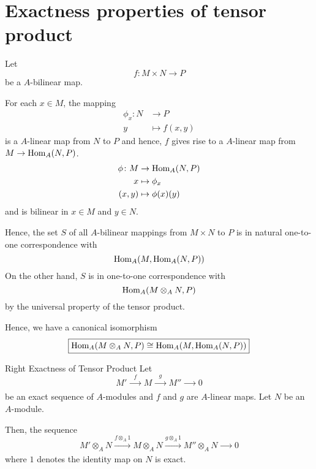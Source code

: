 \pagebreak

\section{Exactness properties of tensor product}

Let
\[
	f \colon M \times N \to P
\]
be a \(A\)-bilinear map.

For each \(x \in M\), the mapping
\begin{align*}
	\phi_x \colon N &\to P \\
	y &\mapsto f(x, y)
\end{align*}
is a \(A\)-linear map from \(N\) to \(P\) and hence, \(f\)
gives rise to a \(A\)-linear map from \(M \to \operatorname{Hom}_A(N, P)\).
\begin{align*}
	\phi \colon M &\to \operatorname{Hom}_A(N, P) \\
	x &\mapsto \phi_x \\
	(x, y) &\mapsto \phi(x)(y)
\end{align*}
and is bilinear in \(x \in M\) and \(y \in N\).

Hence, the set \(S\) of all \(A\)-bilinear mappings from \(M \times N\)
to \(P\) is in natural one-to-one correspondence with
\[
	\operatorname{Hom}_A(M, \operatorname{Hom}_A(N, P))
\]
On the other hand, \(S\) is in one-to-one correspondence with
\[
	\operatorname{Hom}_A(M \otimes_A N, P)
\]
by the universal property of the tensor product.

Hence, we have a canonical isomorphism
\[
	\boxed{\operatorname{Hom}_A(M \otimes_A N, P) \cong \operatorname{Hom}_A(M, \operatorname{Hom}_A(N, P))}
\]

\begin{proposition}{Right Exactness of Tensor Product}{}
	Let
	\[
		M' \xrightarrow[\quad\quad]{f} M \xrightarrow[\quad\quad]{g} M''
		\xrightarrow[\quad\quad]{} 0
	\]
	be an exact sequence of \(A\)-modules and \(f\) and \(g\) are
	\(A\)-linear maps.
	Let \(N\) be an \(A\)-module.

	Then, the sequence
	\[
		M' \otimes_A N \xrightarrow[\quad\quad]{f \otimes_A 1} M \otimes_A N
		\xrightarrow[\quad\quad]{g \otimes_A 1} M'' \otimes_A N
		\xrightarrow[\quad\quad]{} 0
	\]
	where \(1\) denotes the identity map on \(N\) is exact.
\end{proposition}